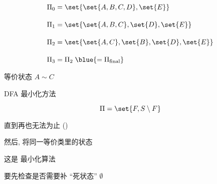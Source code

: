 \begin{frame}{}
  \begin{align*}
    \Pi_{0} &= \set{\set{A, B, C, D}, \set{E}} \\[10pt]
    \Pi_{1} &= \set{\set{A, B, C}, \set{D}, \set{E}} \\[10pt]
    \Pi_{2} &= \set{\set{A, C}, \set{B}, \set{D}, \set{E}} \\[10pt]
    \Pi_{3} &= \Pi_{2} \;\blue{= \Pi_{\text{final}}}
  \end{align*}
\end{frame}

\begin{frame}{}

  \begin{center}
    等价状态 $A \sim C$
  \end{center}


  \pause
  \begin{center}
     
  \end{center}
\end{frame}

\begin{frame}{}
  \begin{center}
    DFA 最小化方法
  \end{center}

  \[
    \Pi = \set{F, S \setminus F}
  \]


  \begin{center}
    直到再也无法为止 \quad ()

    \vspace{0.40cm}
    然后, 将同一等价类里的状态
  \end{center}
\end{frame}

\begin{frame}{}
  \begin{center}

    \vspace{0.60cm}
    这是  最小化算法

    \pause
    \vspace{0.60cm}
    要先检查是否需要补 ``死状态'' $\emptyset$
  \end{center}
\end{frame}

